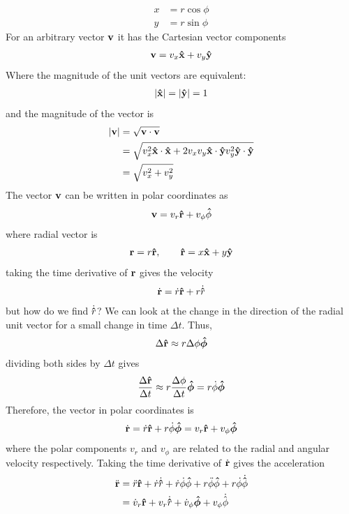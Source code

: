 \documentclass[../main.tex]{subfiles}
\begin{document}
\begin{align*}
    x &= r \cos\phi \\
    y &= r \sin\phi
\end{align*}
For an arbitrary vector $\vb{v}$ it has the Cartesian vector components
\begin{align*}
    \vb{v} = v_x \vu{x} + v_y \vu{y}
\end{align*}
Where the magnitude of the unit vectors are equivalent:
\begin{align*}
    \abs{\vu{x}} = \abs{\vu{y}} = 1
\end{align*}
and the magnitude of the vector is
\begin{align*}
    \abs{\vb{v}} &= \sqrt{\vb{v} \cdot \vb{v}} \\
    &= \sqrt{v_x^2 \vu{x} \cdot \vu{x} + 2 v_x v_y \vu{x} \cdot \vu{y} v_y^2 \vu{y} \cdot \vu{y}}\\
    &= \sqrt{v_x^2 + v_y^2}
\end{align*}
The vector $\vb{v}$ can be written in polar coordinates as
\begin{align*}
    \vb{v} = v_r \vu{r} + v_\phi \vu{\phi}
\end{align*}
where radial vector is
\begin{align*}
    \vb{r} = r \vu{r}, \qquad \vu{r} = x \vu{x} + y \vu{y}
\end{align*}
taking the time derivative of $\vb{r}$ gives the velocity
\begin{align*}
    \dot{\vb{r}} = \dot{r} \vu{r} + r \dot{\vu{r}} 
\end{align*}
but how do we find $\dot{\vu{r}}$? We can look at the change in the direction of the radial unit
vector for a small change in time $\Delta t$. Thus,
\begin{align*}
    \Delta \vu{r} \approx r \Delta\phi \vu*{\phi}
\end{align*}
dividing both sides by $\Delta t$ gives
\begin{align*}
    \frac{\Delta \vu{r}}{\Delta t} \approx r \frac{\Delta \phi}{\Delta t} \vu*{\phi}
    = r \dot\phi \vu*{\phi}
\end{align*}
Therefore, the vector in polar coordinates is
\begin{align*}
    \dot{\vb{r}} = \dot{r} \vu{r} + r \dot\phi \vu*{\phi} = v_r \vu{r} + v_\phi \vu*{\phi}
\end{align*}
where the polar components $v_r$ and $v_\phi$ are related to the radial and angular velocity
respectively. Taking the time derivative of $\dot{\vb{r}}$ gives the acceleration
\begin{align*}
    \ddot{\vb{r}} &= \ddot r \vu{r} + \dot r \dot{\vu{r}} + \dot r \dot\phi \vu{\phi} + 
    r \ddot\phi \vu{\phi} + r \dot\phi \dot{\vu\phi} \\
    &= \dot{v}_r \vu{r} + v_r \dot{\vu{r}} + \dot{v}_\phi \vu*{\phi} + v_\phi \dot{\vu*{\phi}}
\end{align*}
\end{document}
